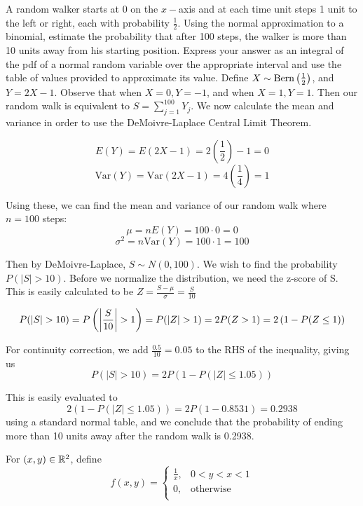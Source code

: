 \documentclass{exam}
\begin{document}
\begin{questions}
\newpage
\question
A random walker starts at 0 on the $x-$axis and at each time unit steps 1 unit to the left or right, each with probability $\frac{1}{2}$. Using the normal approximation to a binomial, estimate the probability that after 100 steps, the walker is more than 10 units away from his starting position. Express your answer as an integral of the pdf of a normal random variable over the appropriate interval and use the table of values provided to approximate its value.
\sol
Define $X\sim \text{Bern}\left( \frac{1}{2} \right)$, and $Y = 2X - 1$. Observe that when $X = 0, Y = -1$, and when $X = 1, Y = 1$. Then our random walk is equivalent to $S = \sum_{j = 1}^{100} Y_j$. We now calculate the mean and variance in order to use the DeMoivre-Laplace Central Limit Theorem.

$$E(Y) = E(2X - 1) = 2(\frac{1}{2}) - 1 = 0$$
$$\text{Var}(Y) = \text{Var}(2X - 1) = 4(\frac{1}{4}) = 1$$

Using these, we can find the mean and variance of our random walk where $n = 100$ steps:
$$\mu = nE(Y) = 100 \cdot 0 = 0$$
$$\sigma^2 = n\text{Var}(Y) = 100\cdot 1 = 100$$

Then by DeMoivre-Laplace, $S \sim N(0, 100)$. We wish to find the probability $P(|S| > 10)$. Before we normalize the distribution, we need the z-score of S. This is easily calculated to be $Z = \frac{S - \mu}{\sigma} = \frac{S}{10}$

$$P(|S| > 10) = P\left( \left| \frac{S}{10} \right| > 1 \right) = P(|Z| > 1) = 2P(Z > 1) = 2\left( 1 - P(Z \leq 1) \right)$$

For continuity correction, we add $\frac{0.5}{10} = 0.05$ to the RHS of the inequality, giving us
$$P(|S| > 10) = 2P(1 - P(|Z| \leq 1.05))$$

This is easily evaluated to
$$2(1 - P(|Z| \leq 1.05)) = 2P(1 - 0.8531) = 0.2938$$
using a standard normal table, and we conclude that the probability of ending more than 10 units away after the random walk is 0.2938.


\newpage
\question
For $(x,y) \in \mathbb {R}^2$, define
$$f(x, y) =
\begin{cases}
    \frac{1}{x}, & 0 < y < x < 1 \\
    0, & \text{otherwise} \\
\end{cases}$$

\end{questions}
\end{document}
